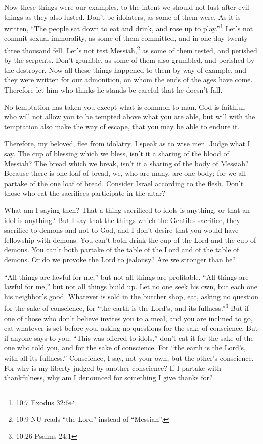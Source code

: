 \myverse{}Now these things were our examples, to the intent we should not
lust after evil things as they also lusted.
\myverse{}Don’t be idolaters, as some of them were. As it is written, “The people sat
down to eat and drink, and rose up to play.”\footnote{10:7 Exodus 32:6}
\myverse{}Let’s not commit sexual immorality, as some of them committed, and in one day
twenty-three thousand fell.
\myverse{}Let’s not test Messiah,\footnote{10:9 NU reads “the Lord” instead of “Messiah”.} as some of them tested, and perished by the
serpents.
\myverse{}Don’t grumble, as some of them also grumbled, and perished by the destroyer.
\myverse{}Now all these things happened to them by way of example, and they were written
for our admonition, on whom the ends of the ages have come.
\myverse{}Therefore let him who thinks he stands be careful that he doesn’t fall.

\myverse{}No temptation has taken you except what is common to man. God
is faithful, who will not allow you to be tempted above what you are able, but will with the temptation
also make the way of escape, that you may be able to endure it.

\myverse{}Therefore, my beloved, flee from idolatry.
\myverse{}I speak as to wise men. Judge what I say.
\myverse{}The cup of blessing which we bless, isn’t it a sharing of the blood of Messiah?
The bread which we break, isn’t it a sharing of the body of Messiah?
\myverse{}Because there is one loaf of bread, we, who are many, are one body; for we
all partake of the one loaf of bread.
\myverse{}Consider Israel according to the flesh. Don’t those who eat the sacrifices
participate in the altar?

\myverse{}What am I saying then? That a thing sacrificed to idols is anything,
or that an idol is anything?
\myverse{}But I say that the things which the Gentiles sacrifice, they sacrifice to
demons and not to God, and I don’t desire that you would have fellowship with demons.
\myverse{}You can’t both drink the cup of the Lord and the cup of demons. You can’t
both partake of the table of the Lord and of the table of demons.
\myverse{}Or do we provoke the Lord to jealousy? Are we stronger than he?

\myverse{}“All things are lawful for me,” but not all things are profitable.
“All things are lawful for me,” but not all things build up.
\myverse{}Let no one seek his own, but each one his neighbor’s good.
\myverse{}Whatever is sold in the butcher shop, eat, asking no question for the sake
of conscience,
\myverse{}for “the earth is the Lord’s, and its fullness.”\footnote{10:26 Psalms 24:1
}
\myverse{}But if one of those who don’t believe invites you to a meal, and you are
inclined to go, eat whatever is set before you, asking no questions for the sake of conscience.
\myverse{}But if anyone says to you, “This was offered to idols,” don’t eat it for
the sake of the one who told you, and for the sake of conscience. For “the earth is the Lord’s, with all
its fullness.”
\myverse{}Conscience, I say, not your own, but the other’s conscience. For why is my
liberty judged by another conscience?
\myverse{}If I partake with thankfulness, why am I denounced for something I give thanks
for?

